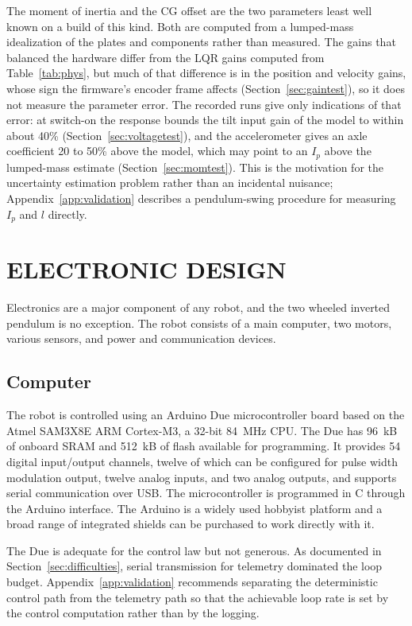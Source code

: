 The moment of inertia and the CG offset are the two parameters least well
known on a build of this kind. Both are computed from a lumped-mass
idealization of the plates and components rather than measured. The gains that
balanced the hardware differ from the LQR gains computed from
Table~\ref{tab:phys}, but much of that difference is in the position and
velocity gains, whose sign the firmware's encoder frame affects
(Section~\ref{sec:gaintest}), so it does not measure the parameter error. The
recorded runs give only indications of that error: at switch-on the response
bounds the tilt input gain of the model to within about 40\%
(Section~\ref{sec:voltagetest}), and the accelerometer gives an axle
coefficient 20 to 50\% above the model, which may point to an $I_p$ above the
lumped-mass estimate (Section~\ref{sec:momtest}). This is the motivation for the uncertainty
estimation problem rather than an incidental nuisance;
Appendix~\ref{app:validation} describes a pendulum-swing procedure for
measuring $I_p$ and $l$ directly.

\section{ELECTRONIC DESIGN}

Electronics are a major component of any robot, and the two wheeled inverted
pendulum is no exception. The robot consists of a main computer, two motors,
various sensors, and power and communication devices.

\subsection{Computer}

The robot is controlled using an Arduino Due microcontroller board based on the
Atmel SAM3X8E ARM Cortex-M3, a 32-bit \SI{84}{MHz} CPU. The Due has
\SI{96}{kB} of onboard SRAM and \SI{512}{kB} of flash available for
programming. It provides 54 digital input/output channels, twelve of which can
be configured for pulse width modulation output, twelve analog inputs, and two
analog outputs, and supports serial communication over USB. The microcontroller
is programmed in C through the Arduino interface. The Arduino is a widely used
hobbyist platform and a broad range of integrated shields can be purchased to
work directly with it.

The Due is adequate for the control law but not generous. As documented in
Section~\ref{sec:difficulties}, serial transmission for telemetry dominated the
loop budget. Appendix~\ref{app:validation} recommends separating the
deterministic control path from the telemetry path so that the achievable loop
rate is set by the control computation rather than by the logging.

